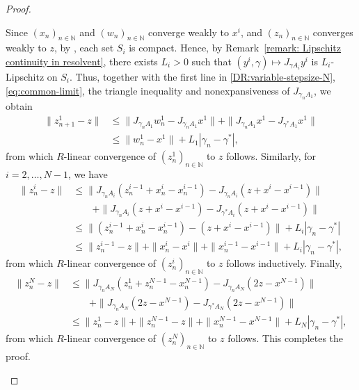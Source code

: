 \documentclass[a4paper,12pt]{article}
\begin{document}
\begin{proof}
\begin{enumerate}
    Since $(x_n)_{n\in\mathbb{N}}$ and $(w_n)_{n\in\mathbb{N}}$ converge weakly to $x^i$, and $(z_n)_{n\in\mathbb{N}}$ converges weakly to $z$, by \cite[Theorem~2.38]{aliprantis2006infinite}, each set $S_i$ is compact.  
    Hence, by Remark~\ref{remark: Lipschitz continuity in resolvent}, there exists $L_i>0$ such that $(y^i,\gamma)\mapsto J_{\gamma A_i}y^i$ is $L_i$-Lipschitz on $S_i$. Thus,  together with the first line in \eqref{DR:variable-stepsize-N}, \eqref{eq:common-limit}, the triangle inequality and nonexpansiveness of $J_{\gamma_nA_1}$, we obtain
    \begin{align*}
    \|z^1_{n+1}-z\| 
    &\leq \|J_{\gamma_nA_1}w^1_n-J_{\gamma_nA_1}x^1\|+\|J_{\gamma_nA_1}x^1-J_{\gamma^*A_1}x^1\|\\
    &\leq \|w^1_n-x^1\| + L_1|\gamma_n-\gamma^*|,
    \end{align*}
    from which $R$-linear convergence of $(z_n^1)_{n\in\mathbb{N}}$ to $z$ follows. Similarly, for $i=2,\dots,N-1$, we have
    \begin{align*}
    \|z^i_n-z\|
    &\leq \|J_{\gamma_nA_i}(z_n^{i-1}+x_{n}^i-x_n^{i-1})-J_{\gamma_nA_i}(z+x^i-x^{i-1})\|\\
    &\qquad  +\|J_{\gamma_nA_i}(z+x^i-x^{i-1})-J_{\gamma^*A_i}(z+x^i-x^{i-1})\|\\
    &\leq \|(z_n^{i-1}+x_{n}^i-x_n^{i-1})-(z+x^i-x^{i-1})\| + L_i|\gamma_n-\gamma^*| \\
    &\leq \|z_n^{i-1}-z\|+\|x_{n}^i-x^i\|+\|x_n^{i-1}-x^{i-1}\| + L_i|\gamma_n-\gamma^*|,
    \end{align*}
    from which $R$-linear convergence of $(z_n^i)_{n\in\mathbb{N}}$ to $z$ follows inductively. Finally, 
    \begin{align*}
        \|z^N_n-z\| & \leq \|J_{\gamma_nA_N}(z_n^1+z_n^{N-1}-x_n^{N-1})-J_{\gamma_nA_N}(2z-x^{N-1})\|\\
        &\qquad + \|J_{\gamma_nA_N}(2z-x^{N-1})-J_{\gamma^*A_N}(2z-x^{N-1})\| \\
        &\leq \|z_n^1-z\| + \|z_n^{N-1}-z\| + \|x_n^{N-1}-x^{N-1}\| + L_N|\gamma_n-\gamma^*|,
    \end{align*}
    from which $R$-linear convergence of $(z_n^N)_{n\in\mathbb{N}}$ to $z$ follows. This completes the proof.
\end{enumerate}

\end{proof}
\end{document}
